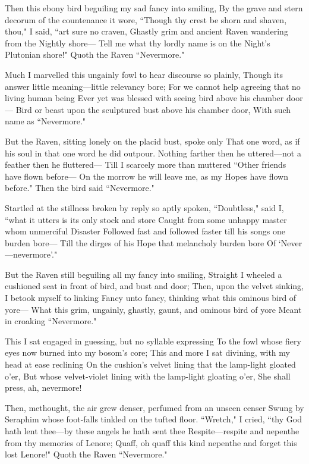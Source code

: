 \documentclass{article}
\begin{document}
Then this ebony bird beguiling my sad fancy into smiling,
By the grave and stern decorum of the countenance it wore,
``Though thy crest be shorn and shaven, thou," I said, ``art sure no craven,
Ghastly grim and ancient Raven wandering from the Nightly shore---
Tell me what thy lordly name is on the Night’s Plutonian shore!"
Quoth the Raven ``Nevermore."

Much I marvelled this ungainly fowl to hear discourse so plainly,
Though its answer little meaning---little relevancy bore;
For we cannot help agreeing that no living human being
Ever yet was blessed with seeing bird above his chamber door---
Bird or beast upon the sculptured bust above his chamber door,
With such name as ``Nevermore."

But the Raven, sitting lonely on the placid bust, spoke only
That one word, as if his soul in that one word he did outpour.
Nothing farther then he uttered---not a feather then he fluttered---
Till I scarcely more than muttered ``Other friends have flown before---
On the morrow he will leave me, as my Hopes have flown before."
Then the bird said ``Nevermore."

Startled at the stillness broken by reply so aptly spoken,
``Doubtless," said I, ``what it utters is its only stock and store
Caught from some unhappy master whom unmerciful Disaster
Followed fast and followed faster till his songs one burden bore---
Till the dirges of his Hope that melancholy burden bore
Of ‘Never---nevermore’."

But the Raven still beguiling all my fancy into smiling,
Straight I wheeled a cushioned seat in front of bird, and bust and door;
Then, upon the velvet sinking, I betook myself to linking
Fancy unto fancy, thinking what this ominous bird of yore---
What this grim, ungainly, ghastly, gaunt, and ominous bird of yore
Meant in croaking ``Nevermore."

This I sat engaged in guessing, but no syllable expressing
To the fowl whose fiery eyes now burned into my bosom’s core;
This and more I sat divining, with my head at ease reclining
On the cushion’s velvet lining that the lamp-light gloated o’er,
But whose velvet-violet lining with the lamp-light gloating o’er,
She shall press, ah, nevermore!

Then, methought, the air grew denser, perfumed from an unseen censer
Swung by Seraphim whose foot-falls tinkled on the tufted floor.
``Wretch," I cried, ``thy God hath lent thee---by these angels he hath sent thee
Respite---respite and nepenthe from thy memories of Lenore;
Quaff, oh quaff this kind nepenthe and forget this lost Lenore!"
Quoth the Raven ``Nevermore."
\end{document}
